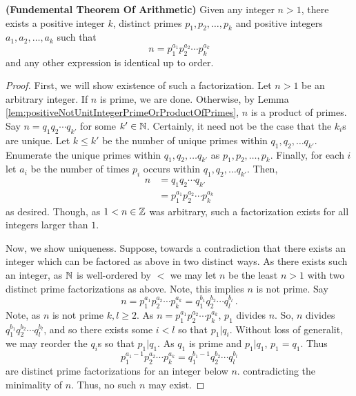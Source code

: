 \guard








\begin{thm}
\label{thm:fundementalTheoremOfArithmetic}
  \textbf{(Fundemental Theorem Of Arithmetic)}
  Given any integer $n>1$, there exists a positive integer $k$, distinct primes $p_1,p_2,\dots,p_k$ and positive integers $a_1,a_2,\dots,a_k$ such that \[ n=p_1^{a_1}p_2^{a_2}\cdots p_k^{a_k}\] and any other expression is identical up to order.
\end{thm}
\begin{proof}
  First, we will show existence of such a factorization.
  Let $n>1$ be an arbitrary integer.
  If $n$ is prime, we are done.
  Otherwise, by Lemma \ref{lem:positiveNotUnitIntegerPrimeOrProductOfPrimes}, $n$ is a product of primes.
  Say $n = q_1q_2\cdots q_{k'}$ for some $k'\in\mathbb{N}$.
  Certainly, it need not be the case that the $k_i$s are unique.
  Let $k\leq k'$ be the number of unique primes within $q_1,q_2,\dots q_{k'}$.
  Enumerate the unique primes within $q_1,q_2,\dots q_{k'}$ as $p_1,p_2,\dots,p_k$.
  Finally, for each $i$ let $a_i$ be the number of times $p_i$ occurs within  $q_1,q_2,\dots q_{k'}$.
  Then,
  \begin{align*}
    n &= q_1q_2\cdots q_{k'} \\
      &= p_1^{a_1}p_2^{a_2}\cdots p_k^{a_k}
  \end{align*}
  as desired.
  Though, as $1<n\in\mathbb{Z}$ was arbitrary, such a factorization exists for all integers larger than $1$.


  Now, we show uniqueness.
  Suppose, towards a contradiction that there exists an integer which can be factored as above in two distinct ways.
  As there exists such an integer, as $\mathbb{N}$ is well-ordered by $<$ we may let $n$ be the least $n>1$ with two distinct prime factorizations as above.
  Note, this implies $n$ is not prime.
  Say \[n=p_1^{a_1}p_2^{a_2}\cdots p_k^{a_k} =q_1^{b_1}q_2^{b_2}\cdots q_l^{b_l}\,.\]
  Note, as $n$ is not prime $k,l\geq 2$.
  As $n=p_1^{a_1}p_2^{a_2}\cdots p_k^{a_k}$, $p_1$ divides $n$.
  So, $n$ divides $q_1^{b_1}q_2^{b_2}\cdots q_l^{b_l}$, and so there exists some $i<l$ so that $p_1\vert q_i$.
  Without loss of generalit, we may reorder the $q_i$s so that $p_1\vert q_1$.
  As $q_1$ is prime and $p_1\vert q_1$, $p_1=q_1$.
  Thus \[ p_1^{a_1-1}p_2^{a_2}\cdots p_k^{a_k} = q_1^{b_1-1}q_2^{b_2}\cdots q_l^{b_l}\] are distinct prime factorizations for an integer below $n$. contradicting the minimality of $n$.
  Thus, no such $n$ may exist.
\end{proof}
